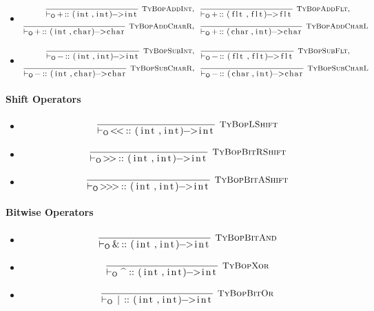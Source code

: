 \documentclass{article}
\newcommand{\code}[1]{\lstinline[columns=fixed]{#1}}
\newcommand{\drmrule}[5]{\frac{#1}{#2\vdash_{\mathsf{#3}}#4}\textsc{\ \small{#5}}}
\newcommand{\mc}[1]{\textnormal{\code{#1}}}
\newcommand{\subsubsubsection}{\paragraph}
\begin{document}
					\begin{itemize}
						\item
							\begin{align*}
								\drmrule{}{}{O}{\mc{+} :: \mc{(int,int)->int}}{TyBopAddInt},\ \ &
								\drmrule{}{}{O}{\mc{+} :: \mc{(flt,flt)->flt}}{TyBopAddFlt},\\
								\drmrule{}{}{O}{\mc{+} :: \mc{(int,char)->char}}{TyBopAddCharR},\ \ &
								\drmrule{}{}{O}{\mc{+} :: \mc{(char,int)->char}}{TyBopAddCharL}
							\end{align*}
						\item
							\begin{align*}
								\drmrule{}{}{O}{\mc{-} :: \mc{(int,int)->int}}{TyBopSubInt},\ \ &
								\drmrule{}{}{O}{\mc{-} :: \mc{(flt,flt)->flt}}{TyBopSubFlt},\\
								\drmrule{}{}{O}{\mc{-} :: \mc{(int,char)->char}}{TyBopSubCharR},\ \ &
								\drmrule{}{}{O}{\mc{-} :: \mc{(char,int)->char}}{TyBopSubCharL}
							\end{align*}
					\end{itemize}
				
				\subsubsubsection{Shift Operators}
				
					\begin{itemize}
						\item
							\begin{align*}
								\drmrule{}{}{O}{\mc{<<} :: \mc{(int,int)->int}}{TyBopLShift}
							\end{align*}
						\item
							\begin{align*}
								\drmrule{}{}{O}{\mc{>>} :: \mc{(int,int)->int}}{TyBopBitRShift}
							\end{align*}
						\item
							\begin{align*}
								\drmrule{}{}{O}{\mc{>>>} :: \mc{(int,int)->int}}{TyBopBitAShift}
							\end{align*}
					\end{itemize}
				
				\subsubsubsection{Bitwise Operators}
				
					\begin{itemize}
						\item
							\begin{align*}
								\drmrule{}{}{O}{\mc{\&} :: \mc{(int,int)->int}}{TyBopBitAnd}
							\end{align*}
						\item
							\begin{align*}
								\drmrule{}{}{O}{\mc{^} :: \mc{(int,int)->int}}{TyBopXor}
							\end{align*}
						\item
							\begin{align*}
								\drmrule{}{}{O}{\mc{|} :: \mc{(int,int)->int}}{TyBopBitOr}
							\end{align*}
					\end{itemize}
				
\end{document}
